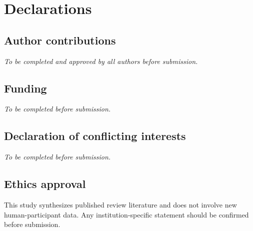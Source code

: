 \section{Declarations}

\subsection{Author contributions}
\textit{To be completed and approved by all authors before submission.}

\subsection{Funding}
\textit{To be completed before submission.}

\subsection{Declaration of conflicting interests}
\textit{To be completed before submission.}

\subsection{Ethics approval}
This study synthesizes published review literature and does not involve new human-participant data. Any institution-specific statement should be confirmed before submission.
